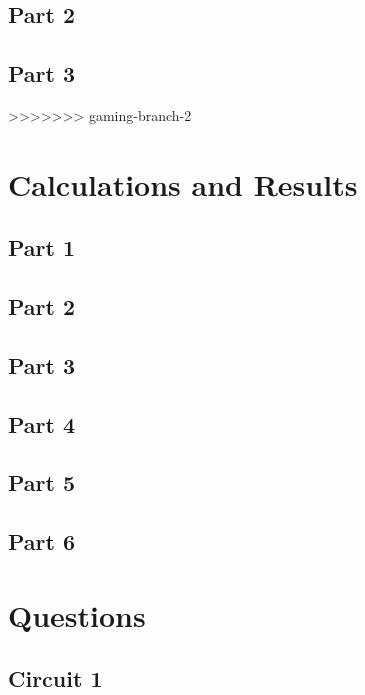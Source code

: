 \documentclass[titlepage]{article}
\begin{document}
	    \subsection{Part 2} 


	    \subsection{Part 3}

>>>>>>> gaming-branch-2
    \section{Calculations and Results}

        \subsection{Part 1} 

        \subsection{Part 2} 

        \subsection{Part 3} 
        \subsection{Part 4} 
        \subsection{Part 5} 
        \subsection{Part 6} 


	\section{Questions}


    	\subsection{Circuit 1}
\end{document}
